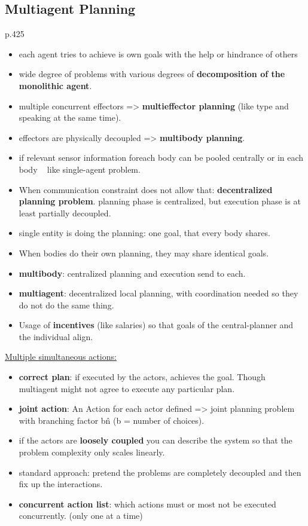 \subsection{Multiagent Planning}
p.425
\begin{itemize}[noitemsep,nolistsep]
	\item each agent tries to achieve is own goals with the help or hindrance of others
	\item wide degree of problems with various degrees of \textbf{decomposition of the monolithic agent}.
	\item multiple concurrent effectors => \textbf{multieffector planning} (like type and speaking at the same time).
	\item effectors are physically decoupled => \textbf{multibody planning}.
	\item if relevant sensor information foreach body can be pooled centrally or in each body ~ like single-agent problem.
	\item When communication constraint does not allow that: \textbf{decentralized planning problem}. planning phase is centralized, but execution phase is at least partially decoupled.
	\item single entity is doing the planning: one goal, that every body shares.
	\item When bodies do their own planning, they may share identical goals.
	\item \textbf{multibody}: centralized planning and execution send to each.
	\item \textbf{multiagent}: decentralized local planning, with coordination needed so they do not do the same thing.
	\item Usage of \textbf{incentives} (like salaries) so that goals of the central-planner and the individual align.
\end{itemize}

\underline{Multiple simultaneous actions:}
\begin{itemize}[noitemsep,nolistsep]
	\item \textbf{correct plan}: if executed by the actors, achieves the goal. Though multiagent might not agree to execute any particular plan.
	\item \textbf{joint action}: An Action for each actor defined => joint planning problem with branching factor b\^n (b = number of choices).
	\item if the actors are \textbf{loosely coupled} you can describe the system so that the problem complexity only scales linearly.
	\item standard approach: pretend the problems are completely decoupled and then fix up the interactions.
	\item \textbf{concurrent action list}: which actions must or most not be executed concurrently. (only one at a time)
\end{itemize}


